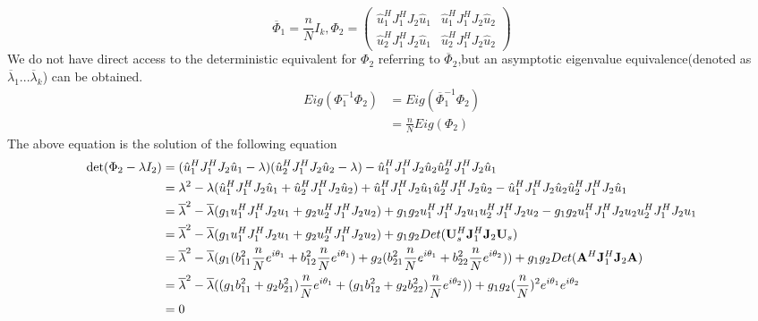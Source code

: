 \documentclass[11pt,a4paper]{article}
\begin{document}
\begin{equation}
    \overline{\Phi}_1 = \frac{n}{N} I_k,  \Phi_2 = \begin{pmatrix} 
\hat{u}_1^HJ_1^HJ_2\hat{u}_1 & \hat{u}^H_1J_1^HJ_2\hat{u}_2 \\
\hat{u}_2^HJ_1^HJ_2\hat{u}_1 & \hat{u}^H_2J_1^HJ_2\hat{u}_2
\end{pmatrix}
\end{equation}
We do not have direct access to the deterministic equivalent for $\Phi_2$ referring to $\overline{\Phi}_2$,but an asymptotic eigenvalue equivalence(denoted as $\overline{\lambda}_1 ... \overline{\lambda}_k$) can be obtained.
\begin{align}
    Eig(\Phi_1^{-1}\Phi_2) & = Eig(\overline{\Phi}_1^{-1} \Phi_2) \\
    &= \frac{n}{N}Eig(\Phi_2)
\end{align}
The above equation is the solution of the following equation
$$
\begin{aligned}
    \det(\Phi_2 - \lambda I_2) &= (\hat{u}_1^HJ_1^HJ_2\hat{u}_1-\lambda)
(\hat{u}_2^HJ_1^HJ_2\hat{u}_2-\lambda) - \hat{u}_1^HJ_1^HJ_2\hat{u}_2\hat{u}_2^HJ_1^HJ_2\hat{u}_1 \\
&=\lambda^2 - \lambda(\hat{u}_1^HJ_1^HJ_2\hat{u}_1 + \hat{u}_2^HJ_1^HJ_2\hat{u}_2)+ 
\hat{u}_1^HJ_1^HJ_2\hat{u}_1\hat{u}_2^HJ_1^HJ_2\hat{u}_2 - \hat{u}_1^HJ_1^HJ_2\hat{u}_2\hat{u}_2^HJ_1^HJ_2\hat{u}_1 \\
&=\overline{\lambda}^2 - \overline{\lambda}( g_1{u}_1^HJ_1^HJ_2 {u}_1 +  g_2{u}_2^HJ_1^HJ_2 {u}_2)+ 
g_1g_2{u}_1^HJ_1^HJ_2{u}_1{u}_2^HJ_1^HJ_2{u}_2 - g_1g_2{u}_1^HJ_1^HJ_2{u}_2{u}_2^HJ_1^HJ_2{u}_1 \\
&=\overline{\lambda}^2 - \overline{\lambda}( g_1{u}_1^HJ_1^HJ_2 {u}_1 +  g_2{u}_2^HJ_1^HJ_2 {u}_2)+ 
g_1g_2 Det({\mathbf{U}}_s^H {\mathbf{J}}_1^H{\mathbf{J}}_2 {\mathbf{U}}_s) \\
&=\overline{\lambda}^2 - \overline{\lambda}( g_1(b_{11}^2 \frac{n}{N}e^{i\theta_1}+b_{12}^2\frac{n}{N}e^{i\theta_1}) +  g_2(b_{21}^2 \frac{n}{N}e^{i\theta_1}+b_{22}^2\frac{n}{N}e^{i\theta_2}))+ 
g_1g_2 Det({\mathbf{A}}^H {\mathbf{J}}_1^H{\mathbf{J}}_2 {\mathbf{A}}) \\
&=\overline{\lambda} ^2 - \overline{\lambda}((g_1b_{11}^2 + g_2 b_{21}^2)\frac{n}{N} e^{i\theta_1} + (g_1b_{12}^2 + g_2 b_{22}^2)\frac{n}{N} e^{i\theta_2}))+g_1g_2(\frac{n}{N})^2 e^{i\theta_1} e^{i\theta_2} \\
&= 0
\end{aligned}$$
\end{document}
